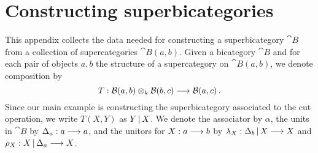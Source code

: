 \documentclass[english,letter paper,12pt,leqno]{article}
\theoremstyle{example}
\numberwithin{equation}{section}
\begin{document}
\section{Constructing superbicategories}\label{section:constructing_superbicategories}

This appendix collects the data needed for constructing a superbicategory $\cat{B}$ from a collection of supercategories $\cat{B}(a,b)$. Given a bicategory $\cat{B}$ and for each pair of objects $a,b$ the structure of a supercategory on $\cat{B}(a,b)$, we denote composition by
\[
T: \mathcal{B}(a, b) \otimes_k \mathcal{B}(b,c) \longrightarrow \mathcal{B}(a,c)\,.
\]
Since our main example is constructing the superbicategory associated to the cut operation, we write $T(X,Y)$ as $Y \,|\, X$. We denote the associator by $\alpha$, the units in $\cat{B}$ by $\Delta_a: a \longrightarrow a$, and the unitors for $X: a \longrightarrow b$ by $\lambda_X: \Delta_b \,|\, X \longrightarrow X$ and $\rho_X: X \,|\, \Delta_a \longrightarrow X$.
\end{document}
